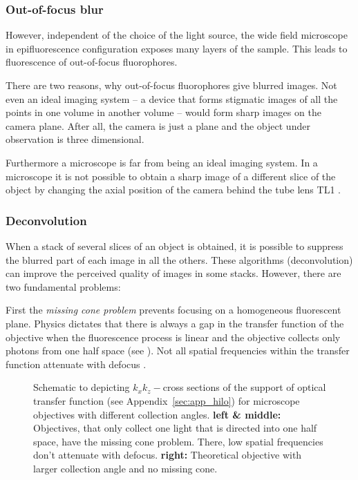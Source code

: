 \subsubsection{Out-of-focus blur}
However, independent of the choice of the light source, the wide field
microscope in epifluorescence configuration exposes many layers of the
sample. This leads to fluorescence of out-of-focus fluorophores.

There are two reasons, why out-of-focus fluorophores give blurred
images. Not even an ideal imaging system -- a device that forms
stigmatic images of all the points in one volume in another volume --
would form sharp images on the camera plane. After all, the camera is
just a plane and the object under observation is three dimensional.

Furthermore a microscope is far from being an ideal imaging system. In
a microscope it is not possible to obtain a sharp image of a different
slice of the object by changing the axial position of the camera
behind the tube lens TL1 \citep{Botcherby2007,Botcherby2008a}.
\subsubsection*{Deconvolution}
When a stack of several slices of an object is obtained, it is
possible to suppress the blurred part of each image in all the
others. These algorithms (deconvolution) can improve the perceived
quality of images in some stacks. However, there are two fundamental
problems:

First the \emph{missing cone problem} prevents focusing on a
homogeneous fluorescent plane. Physics dictates that there is always a
gap in the transfer function of the objective when the fluorescence
process is linear and the objective collects only photons from one
half space (see ). Not all spatial
frequencies within the transfer function attenuate with defocus
\citep{Neil1997}.

\begin{figure}[!hbt]
  \centering
  
  \caption{Schematic to depicting $k_xk_z-$cross sections of the
    support of optical transfer function (see
    Appendix~\ref{sec:app_hilo}) for microscope objectives with
    different collection angles. {\bf left \& middle:} Objectives,
    that only collect one light that is directed into one half space,
    have the missing cone problem. There, low spatial frequencies
    don't attenuate with defocus. {\bf right:} Theoretical objective
    with larger collection angle and no missing cone.}
  \label{fig:missing-cone}
\end{figure}

